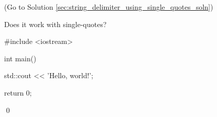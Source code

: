 (Go to Solution \ref{sec:string_delimiter_using_single_quotes_soln})

Does it work with single-quotes?

\begin{console}

#include <iostream>



int main()

{

    std::cout << 'Hello, world!\n';



    return 0;

}

\end{console}

\qed

